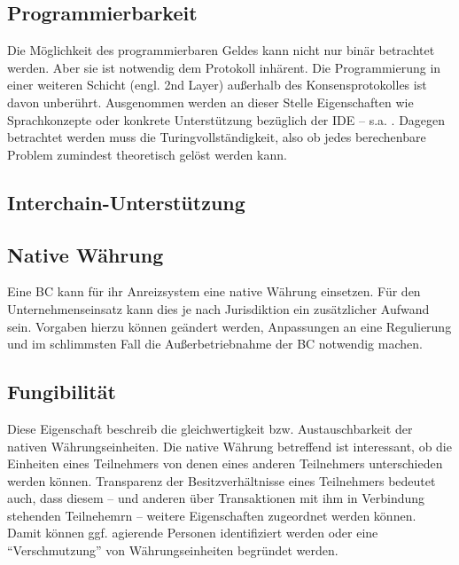 \subsection{Programmierbarkeit}\label{krit:programmierbarkeit}

Die Möglichkeit des programmierbaren Geldes kann nicht nur binär betrachtet werden.
Aber sie ist notwendig dem Protokoll inhärent. Die Programmierung in einer weiteren Schicht (engl. 2nd Layer) außerhalb des Konsensprotokolles ist davon unberührt.
Ausgenommen werden an dieser Stelle Eigenschaften wie Sprachkonzepte oder konkrete Unterstützung bezüglich der \gls{IDE} -- s.a. .
Dagegen betrachtet werden muss die Turingvollständigkeit, also ob jedes berechenbare Problem zumindest theoretisch gelöst werden kann.  



\subsection{Interchain-Unterstützung}\label{krit:interchain}

\subsection{Native Währung}\label{krit:waehrung}

Eine \gls{BC} kann für ihr Anreizsystem eine native Währung einsetzen.
Für den Unternehmenseinsatz kann dies je nach Jurisdiktion ein zusätzlicher Aufwand sein.
Vorgaben hierzu können geändert werden,  Anpassungen an eine Regulierung und im schlimmsten Fall die Außerbetriebnahme der \gls{BC} notwendig machen.

\subsection{Fungibilität}\label{krit:fungibility}

Diese Eigenschaft beschreib die gleichwertigkeit bzw. Austauschbarkeit der nativen Währungseinheiten.
Die native Währung betreffend ist interessant, ob die Einheiten eines Teilnehmers von denen eines anderen Teilnehmers unterschieden werden können.
Transparenz der Besitzverhältnisse eines Teilnehmers bedeutet auch, dass diesem -- und anderen über Transaktionen mit ihm in Verbindung stehenden Teilnehemrn -- weitere Eigenschaften zugeordnet werden können. Damit können ggf. agierende Personen identifiziert werden oder eine \enquote{Verschmutzung} von Währungseinheiten begründet werden.

